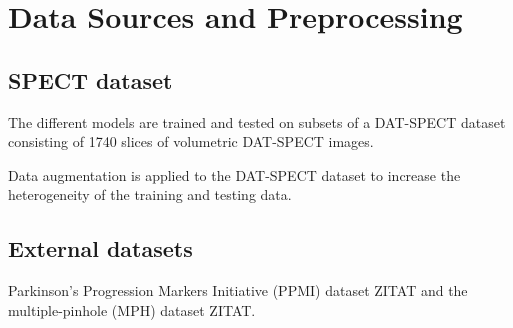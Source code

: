 \section{Data Sources and Preprocessing}
\label{sec:data}

\subsection{SPECT dataset}
\label{subsec:spect_dataset}

The different models are trained and tested on subsets of a DAT-SPECT dataset consisting of 1740 slices of 
volumetric DAT-SPECT images.

Data augmentation is applied to the DAT-SPECT dataset to increase the heterogeneity of the training and testing data.

\subsection{External datasets}
\label{subsec:external_dataset}

Parkinson's Progression Markers Initiative (PPMI) dataset ZITAT and 
the multiple-pinhole (MPH) dataset ZITAT.